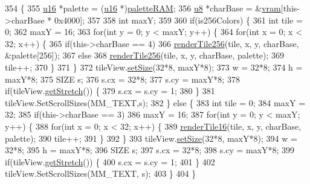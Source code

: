 \begin{DoxyCode}
354 \{
355   \mbox{\hyperlink{_system_8h_a9e6c91d77e24643b888dbd1a1a590054}{u16}} *palette = (\mbox{\hyperlink{_system_8h_a9e6c91d77e24643b888dbd1a1a590054}{u16}} *)\mbox{\hyperlink{_globals_8cpp_aea0283719ad27328f3cf5f883f58813e}{paletteRAM}};
356   \mbox{\hyperlink{_system_8h_aed742c436da53c1080638ce6ef7d13de}{u8}} *charBase = &\mbox{\hyperlink{_globals_8cpp_a983f8cd19ae66ea98e180c2e13bee5b9}{vram}}[this->charBase * 0x4000];
357  
358   \textcolor{keywordtype}{int} maxY;
359 
360   \textcolor{keywordflow}{if}(is256Colors) \{
361     \textcolor{keywordtype}{int} tile = 0;
362     maxY = 16;
363     \textcolor{keywordflow}{for}(\textcolor{keywordtype}{int} y = 0; y < maxY; y++) \{
364       \textcolor{keywordflow}{for}(\textcolor{keywordtype}{int} x = 0; x < 32; x++) \{
365         \textcolor{keywordflow}{if}(this->charBase == 4)
366           \mbox{\hyperlink{class_tile_view_a1232e131b9ef993edea4390809c41814}{renderTile256}}(tile, x, y, charBase, &palette[256]);
367         \textcolor{keywordflow}{else}
368           \mbox{\hyperlink{class_tile_view_a1232e131b9ef993edea4390809c41814}{renderTile256}}(tile, x, y, charBase, palette);
369         tile++;
370       \}
371     \}
372     tileView.\mbox{\hyperlink{class_bitmap_control_a421004fe6ba01329dd69259396592d1f}{setSize}}(32*8, maxY*8);
373     w = 32*8;
374     h = maxY*8;
375     SIZE s;
376     s.cx = 32*8;
377     s.cy = maxY*8;
378     \textcolor{keywordflow}{if}(tileView.\mbox{\hyperlink{class_bitmap_control_a1d3cff9a3b57dd7558d678177dcf4b5c}{getStretch}}()) \{
379       s.cx = s.cy = 1;
380     \}
381     tileView.SetScrollSizes(MM\_TEXT,s);
382   \} \textcolor{keywordflow}{else} \{
383     \textcolor{keywordtype}{int} tile = 0;
384     maxY = 32;
385     \textcolor{keywordflow}{if}(this->charBase == 3)
386       maxY = 16;
387     \textcolor{keywordflow}{for}(\textcolor{keywordtype}{int} y = 0; y < maxY; y++) \{
388       \textcolor{keywordflow}{for}(\textcolor{keywordtype}{int} x = 0; x < 32; x++) \{
389         \mbox{\hyperlink{class_tile_view_abc4f9051fc3c2bfad76a6b11787460f8}{renderTile16}}(tile, x, y, charBase, palette);    
390         tile++;
391       \}
392     \}
393     tileView.\mbox{\hyperlink{class_bitmap_control_a421004fe6ba01329dd69259396592d1f}{setSize}}(32*8, maxY*8);
394     w = 32*8;
395     h = maxY*8;
396     SIZE s;
397     s.cx = 32*8;
398     s.cy = maxY*8;
399     \textcolor{keywordflow}{if}(tileView.\mbox{\hyperlink{class_bitmap_control_a1d3cff9a3b57dd7558d678177dcf4b5c}{getStretch}}()) \{
400       s.cx = s.cy = 1;
401     \}
402     tileView.SetScrollSizes(MM\_TEXT, s);
403   \}
404 \}
\end{DoxyCode}
